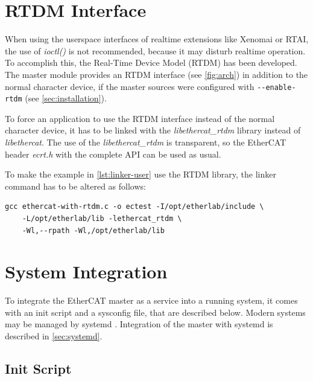 \documentclass[a4paper,12pt,BCOR6mm,bibtotoc,idxtotoc]{scrbook}
\begin{document}

\section{RTDM Interface}
\label{sec:rtdm}

When using the userspace interfaces of realtime extensions like Xenomai or
RTAI, the use of \textit{ioctl()} is not recommended, because it may disturb
realtime operation. To accomplish this, the Real-Time Device Model (RTDM)
\cite{rtdm} has been developed.  The master module provides an RTDM interface
(see \autoref{fig:arch}) in addition to the normal character device, if the
master sources were configured with \lstinline+--enable-rtdm+ (see
\autoref{sec:installation}).

To force an application to use the RTDM interface instead of the normal
character device, it has to be linked with the \textit{libethercat\_rtdm}
library instead of \textit{libethercat}. The use of the
\textit{libethercat\_rtdm} is transparent, so the EtherCAT header
\textit{ecrt.h} with the complete API can be used as usual.

To make the example in \autoref{lst:linker-user} use the RTDM library, the
linker command has to be altered as follows:

\begin{lstlisting}
gcc ethercat-with-rtdm.c -o ectest -I/opt/etherlab/include \
    -L/opt/etherlab/lib -lethercat_rtdm \
    -Wl,--rpath -Wl,/opt/etherlab/lib
\end{lstlisting}


\section{System Integration}
\label{sec:system}

To integrate the EtherCAT master as a service into a running system, it comes
with an init script and a sysconfig file, that are described below. Modern
systems may be managed by systemd \cite{systemd}. Integration of the master
with systemd is described in \autoref{sec:systemd}.

\subsection{Init Script}
\label{sec:init}
\end{document}
